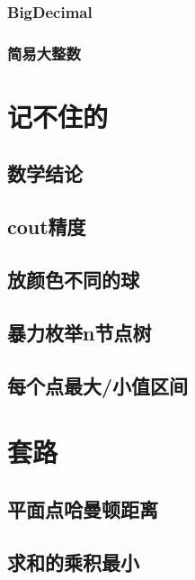 \documentclass{article}
\begin{document}
\subsubsection{BigDecimal}

\subsubsection{简易大整数}



\section{记不住的}
\subsection{数学结论}

\subsection{cout精度}

\subsection{放颜色不同的球}

\subsection{暴力枚举n节点树}

\subsection{每个点最大/小值区间}



\section{套路}
\subsection{平面点哈曼顿距离}

\subsection{求和的乘积最小}

\end{document}
